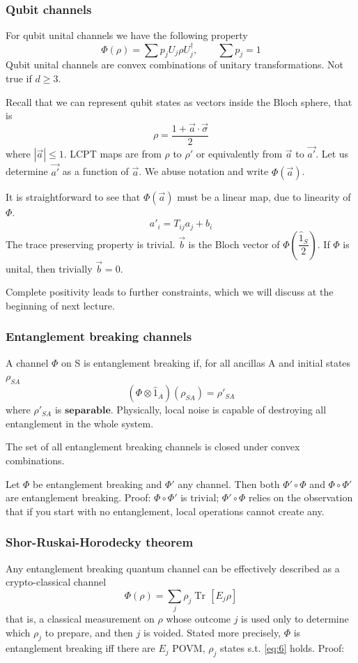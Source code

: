 \documentclass[a4paper, 11pt]{article}
\newcommand{\Tr}{\mathop{\mathrm{Tr}\!}{}}
\begin{document}
	\subsubsection{Qubit channels}
	For qubit unital channels we have the following property
	\[ \Phi(\rho) = \sum p_j U_j \rho U_j^\dagger,\qquad \sum p_j = 1 \]
	Qubit unital channels are convex combinations of unitary transformations. Not true if $d\ge 3$.
	
	Recall that we can represent qubit states as vectors inside the Bloch sphere, that is
	\[ \rho = \dfrac{1+\vec{a}\cdot\vec{\sigma}}{2} \]
	where $|\vec{a}|\le 1$. LCPT maps are from $\rho$ to $\rho'$ or equivalently from $\vec{a}$ to $\vec{a'}$.
	Let us determine $\vec{a'}$ as a function of $\vec{a}$. We abuse notation and write $\Phi(\vec{a})$.
	
	It is straightforward to see that $\Phi(\vec{a})$ must be a linear map, due to linearity of $\Phi$.
	\[ a'_i = T_{ij} a_j + b_i \]
	The trace preserving property is trivial. $\vec{b}$ is the Bloch vector of $\Phi\left(\dfrac{\hat{1}_S}{2}\right)$. If $\Phi$ is unital, then trivially $\vec{b} = 0$.
	
	Complete positivity leads to further constraints, which we will discuss at the beginning of next lecture.
	
	
	\subsubsection{Entanglement breaking channels}
	A channel $\Phi$ on S is entanglement breaking if, for all ancillas A and initial states $\rho_{SA}$
	\[ (\Phi\otimes \hat{1}_A)(\rho_{SA}) = \rho'_{SA} \]
	where $\rho'_{SA}$ is $\mathbf{separable}$. Physically, local noise is capable of destroying all entanglement in the whole system.
	
	The set of all entanglement breaking channels is closed under convex combinations.
	
	Let $\Phi$ be entanglement breaking and $\Phi'$ any channel. Then both $\Phi'\circ \Phi$ and $\Phi\circ \Phi'$ are entanglement breaking. Proof: $\Phi\circ \Phi'$ is trivial; $\Phi'\circ \Phi$ relies on the observation that if you start with no entanglement, local operations cannot create any.
	
	\subsubsection{Shor-Ruskai-Horodecky theorem}
	Any entanglement breaking quantum channel can be effectively described as a crypto-classical channel
	\begin{equation}
	\label{eq:6}
	\Phi(\rho) = \sum_j \rho_j \Tr\left[ E_j \rho \right]
	\end{equation}
	that is, a classical measurement on $\rho$ whose outcome $j$ is used only to determine which $\rho_j$ to prepare, and then $j$ is voided. Stated more precisely, $\Phi$ is entanglement breaking iff there are $E_j$ POVM, $\rho_j$ states s.t. \ref{eq:6} holds. Proof:
	
\end{document}
